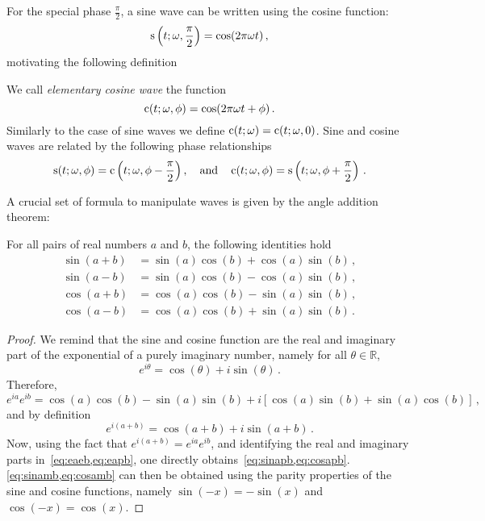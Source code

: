 For the special phase $\frac{\pi}{2}$, a sine wave can be written using the cosine
function:
\begin{equation}
  \operatorname{s}\left(t;\omega,\frac{\pi}{2}\right)= \cos(2\pi\omega t)\,,
\end{equation}
motivating the following definition
\begin{definition}
  \label{def:cosine-wave}
  We call \emph{elementary cosine wave} the function
  \begin{equation}
    \operatorname{c}(t;\omega,\phi)=\cos(2\pi\omega t + \phi)\,.\label{eq:cosine-wave}
  \end{equation}
  Similarly to the case of sine waves we define $\operatorname{c}(t;\omega)=\operatorname{c}(t;\omega,0)$. Sine and
  cosine waves are related by the following phase relationships
  \begin{equation}
    \operatorname{s}(t;\omega,\phi)=\operatorname{c}\left(t;\omega,\phi-\frac{\pi}{2}\right),
    \quad\text{and}\quad
    \operatorname{c}(t;\omega,\phi)=\operatorname{s}\left(t;\omega,\phi+\frac{\pi}{2}\right)\,.
  \end{equation}
\end{definition}
A crucial set of formula to manipulate waves is given by the angle addition
theorem:
\begin{theorem}
  \label{thm:angle-add}
  For all pairs of real numbers $a$ and $b$, the following identities hold
  \begin{align}
    \sin(a+b)&=\sin(a)\cos(b)+\cos(a)\sin(b)\,,\label{eq:sinapb}\\
    \sin(a-b)&=\sin(a)\cos(b)-\cos(a)\sin(b)\,,\label{eq:sinamb}\\
    \cos(a+b)&=\cos(a)\cos(b)-\sin(a)\sin(b)\,,\label{eq:cosapb}\\
    \cos(a-b)&=\cos(a)\cos(b)+\sin(a)\sin(b)\,.\label{eq:cosamb}
  \end{align}
\end{theorem}
\begin{proof}
  We remind that the sine and cosine function are the real and imaginary part of the
  exponential of a purely imaginary number, namely for all $\theta\in\mathbb{R}$,
  \begin{equation}
    e^{i\theta}=\cos(\theta)+i\sin(\theta)\,.
  \end{equation}
  Therefore,
  \begin{equation}
    e^{i a}e^{i b}=\cos(a)\cos(b)-\sin(a)\sin(b)+i[\cos(a)\sin(b)+\sin(a)\cos(b)]\,,\label{eq:eaeb}
  \end{equation}
  and by definition
  \begin{equation}
    e^{i(a+b)}=\cos(a+b)+i\sin(a+b)\,.\label{eq:eapb}
  \end{equation}
  Now, using the fact that $e^{i(a+b)}=e^{i a}e^{i b}$, and identifying the real and
  imaginary parts in~\cref{eq:eaeb,eq:eapb}, one directly
  obtains~\cref{eq:sinapb,eq:cosapb}. \cref{eq:sinamb,eq:cosamb} can then be obtained
  using the parity properties of the sine and cosine functions, namely $\sin(-x)=-\sin(x)$
  and $\cos(-x)=\cos(x)$.
\end{proof}
